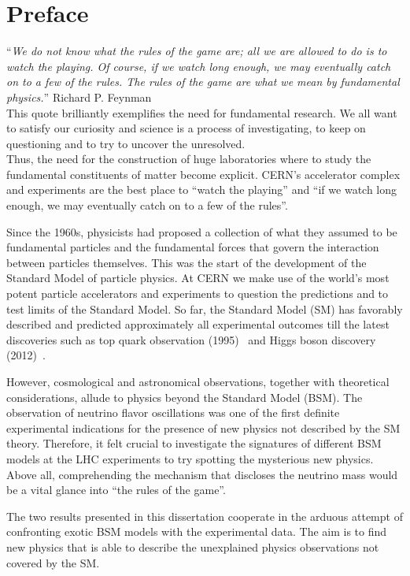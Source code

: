\chapter*{Preface}\label{chapter:introduction}
\enquote{\itshape {\small We do not know what the rules of the game are; all we are allowed to
do is to watch the playing. Of course, if we watch long enough, we may
eventually catch on to a few of the rules. The rules of the game are
what we mean by fundamental physics.}} Richard P. Feynman\\

This quote brilliantly exemplifies the need for fundamental
research. We all want to satisfy our 
curiosity and science is a process of investigating, to keep on
questioning and to try to uncover the unresolved.\\
Thus, the need for the construction
of huge laboratories where to study the fundamental constituents of
matter become explicit.
CERN's accelerator complex and experiments are the
best place to ``watch the playing'' and ``if we watch long enough, we may
eventually catch on to a few of the rules''.

Since the 1960s, physicists had proposed a collection of what
they assumed to be fundamental particles and the fundamental forces
 that govern the interaction between particles themselves. This was
 the start of the development of the Standard Model of particle
 physics. At CERN we make use of the world's
most potent particle accelerators and experiments to question the
predictions and to test limits of the Standard Model. So far,
the Standard Model (SM) has favorably described and predicted
approximately all experimental outcomes till the latest
discoveries such as top quark observation (1995)~\cite{Abachi_1995}
and Higgs boson discovery (2012)~\cite{20121,201230}.

However, cosmological and astronomical observations, together with theoretical
considerations, allude to physics beyond the Standard Model (BSM).
The observation of neutrino flavor oscillations was one of the first 
definite experimental indications for the
presence of new physics not described by the SM theory.
 Therefore, it felt crucial to investigate the signatures of different
 BSM models at the LHC
experiments
to try spotting the mysterious new physics. Above all, comprehending the
mechanism that discloses the neutrino mass would be a
vital glance into ``the rules of the game''.

The two results presented in this dissertation cooperate in the arduous attempt of confronting exotic BSM
models with the experimental data. The aim is to find new
physics that is able to describe the unexplained
physics observations not covered by the SM.\\

